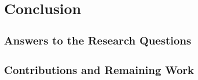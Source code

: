 \chapter{Conclusion}
\label{ch:conclusion}

\section{Answers to the Research Questions}

\section{Contributions and Remaining Work}
